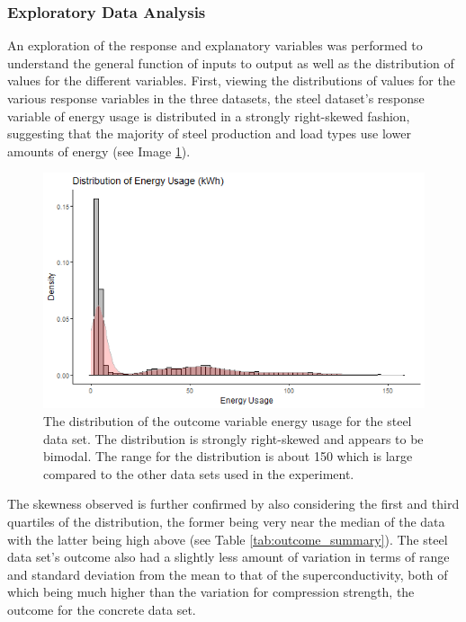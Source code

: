 \documentclass[10pt]{article}\usepackage[]{graphicx}\usepackage[]{xcolor}
\begin{document}
\subsubsection{Exploratory Data Analysis}
An exploration of the response and explanatory variables was performed to understand the general function of inputs to output as well as the distribution of values for the different variables. First, viewing the distributions of values for the various response variables in the three datasets, the steel dataset's response variable of energy usage is distributed in a strongly right-skewed fashion, suggesting that the majority of steel production and load types use lower amounts of energy (see Image \ref{img:steel_dist}). \\

\begin{figure}[htp]
  \centering
  \includegraphics[scale=0.8]{EDA/steel_response_dist.png}
  \caption{The distribution of the outcome variable energy usage for the steel data set. The distribution is strongly right-skewed and appears to be bimodal. The range for the distribution is about 150 which is large compared to the other data sets used in the experiment.}
  \label{img:steel_dist}
\end{figure}

The skewness observed is further confirmed by also considering the first and third quartiles of the distribution, the former being very near the median of the data with the latter being high above (see Table \ref{tab:outcome_summary}). The steel data set's outcome also had a slightly less amount of variation in terms of range and standard deviation from the mean to that of the superconductivity, both of which being much higher than the variation for compression strength, the outcome for the concrete data set.
\end{document}
